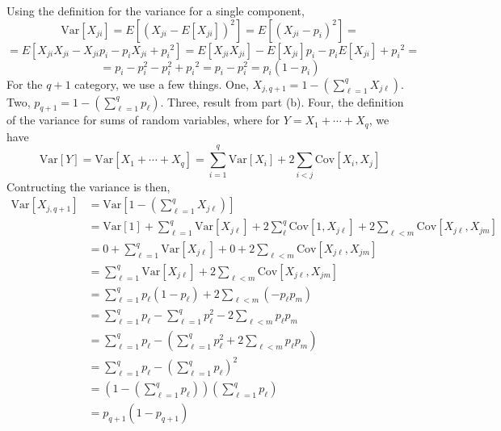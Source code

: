 \begin{enumerate}[label= (\alph*)]
    Using the definition for the variance for a single component,
    \[
        \text{Var}[X_{ji}]
        =
        E[{(X_{ji}-E[X_{ji}])}^{2}]
        =
        E[{(X_{ji}-p_{i})}^{2}]
        =
    \]
    \[
        =
        E[X_{ji}X_{ji} - X_{ji}p_{i} - p_{i}X_{ji} + {p_{i}}^{2}]
        =
        E[X_{ji}X_{ji}] - E[X_{ji}]p_{i} - p_{i}E[X_{ji}] + {p_{i}}^{2}
        =
    \]
    \[
        =
        p_{i} - p_{i}^{2} - p_{i}^{2} + {p_{i}}^{2}
        =
        p_{i} - p_{i}^{2}
        =
        p_{i}(1 - p_{i})
    \]
    For the $q+1$ category, we use a few things. One, $X_{j,q+1} = 1 - \left( \sum_{\ell=1}^{q}{X_{j\ell}} \right)$. Two, $p_{q+1} = 1 - \left( \sum_{\ell=1}^{q}{p_{\ell}} \right)$. Three, result from part (b). Four, the definition of the variance for sums of random variables, where for $Y = X_{1} + \cdots + X_{q}$, we have
    \[
        \text{Var}[Y]
        =
        \text{Var}[X_{1} + \cdots + X_{q}]
        =
        \sum_{i=1}^{q}{\text{Var}[X_{i}]}
        +
        2\sum_{i < j}\text{Cov}[X_{i}, X_{j}]
    \]
    Contructing the variance is then,
    \begin{align*}
        \text{Var}[X_{j,q+1}] 
        &=
        \text{Var}\left[
            1 - \left( \sum_{\ell=1}^{q}{X_{j\ell}} \right)
        \right] \\
        &=
        \scriptstyle
        \text{Var}\left[ 1 \right]
        +
        \sum_{\ell=1}^{q}{\text{Var}\left[X_{j\ell}\right]}
        +
        2\sum_{\ell}^{q}{\text{Cov}\left[1, X_{j\ell}\right]}
        +
        2\sum_{\ell<m}{\text{Cov}\left[X_{j\ell}, X_{jm}\right]} \\
        &=
        0
        +
        \sum_{\ell=1}^{q}{\text{Var}\left[X_{j\ell}\right]}
        +
        0
        +
        2\sum_{\ell<m}{\text{Cov}\left[X_{j\ell}, X_{jm}\right]} \\
        &=
        \sum_{\ell=1}^{q}{\text{Var}\left[X_{j\ell}\right]}
        +
        2\sum_{\ell<m}{\text{Cov}\left[X_{j\ell}, X_{jm}\right]}  \\
        &=
        \sum_{\ell=1}^{q}{p_{\ell}(1-p_{\ell})}
        +
        2\sum_{\ell<m}{(-p_{\ell}p_{m})} \\
        &=
        \sum_{\ell=1}^{q}{p_{\ell}} - \sum_{\ell=1}^{q}{p_{\ell}^{2}}
        -
        2\sum_{\ell<m}{p_{\ell}p_{m}} \\
        &=
        \sum_{\ell=1}^{q}{p_{\ell}}
        -
        \left( \sum_{\ell=1}^{q}{p_{\ell}^{2}} + 2\sum_{\ell<m}{p_{\ell}p_{m}} \right) \\
        &=
        \sum_{\ell=1}^{q}{p_{\ell}}
        -
        {\left( \sum_{\ell=1}^{q}{p_{\ell}} \right)}^{2} \\
        &=
        \left(
            1
            -
            \left( \sum_{\ell=1}^{q}{p_{\ell}} \right)
        \right)
        \left( \sum_{\ell=1}^{q}{p_{\ell}} \right) \\
        &=
        p_{q+1}\left(1 - p_{q+1} \right)
    \end{align*}


\end{enumerate}
